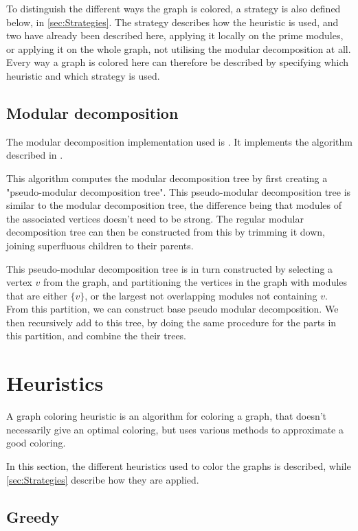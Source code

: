 \documentclass[a4paper]{article}
\begin{document}
To distinguish the different ways the graph is colored, a strategy is also
defined below, in \autoref{sec:Strategies}.  The strategy describes how the
heuristic is used, and two have already been described here, applying it locally
on the prime modules, or applying it on the whole graph, not utilising the
modular decomposition at all. Every way a graph is colored here can therefore be
described by specifying which heuristic and which strategy is used.

\subsection{Modular decomposition}

The modular decomposition implementation used is \cite{Anna}. It implements the
algorithm described in \cite{MDAlgorithm}. 

This algorithm computes the modular decomposition tree by first creating a
"pseudo-modular decomposition tree". This pseudo-modular decomposition tree is
similar to the modular decomposition tree, the difference being that modules of the
associated vertices doesn't need to be strong.  The regular modular
decomposition tree can then be constructed from this by trimming it down,
joining superfluous children to their parents.

This pseudo-modular decomposition tree is in turn constructed by selecting a
vertex $v$ from the graph, and partitioning the vertices in the graph with
modules that are either $\{v\}$, or the largest not overlapping modules
not containing $v$. From this partition, we can construct base pseudo modular
decomposition. We then recursively add to this tree, by doing the same procedure
for the parts in this partition, and combine the their trees.

\section{Heuristics}
\label{sec:Heuristics}

A graph coloring heuristic is an algorithm for coloring a graph, that doesn't
necessarily give an optimal coloring, but uses various methods to approximate a
good coloring.


In this section, the different heuristics used to color the graphs is described,
while \autoref{sec:Strategies} describe how they are applied.
\subsection{Greedy}
\end{document}
